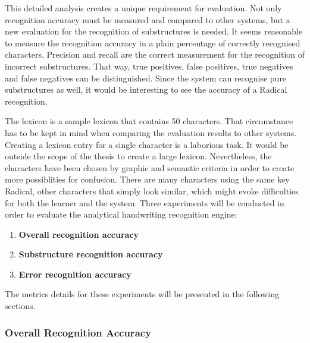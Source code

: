 This detailed analysis creates a unique requirement for evaluation. Not only
recognition accuracy must be measured and compared to other systems,
but a new evaluation for the recognition of substructures is needed.
It seems reasonable to measure the recognition accuracy in a plain 
percentage of correctly recognised characters. 
Precision and recall are the correct measurement for the recognition of 
incorrect substructures. That way, true positives, false positives, 
true negatives and false negatives can be distinguished.
Since the system can recognise pure substructures as well, it would 
be interesting to see the accuracy of a Radical recognition.

The lexicon is a sample lexicon that contains 50 characters. That circumstance
has to be kept in mind when comparing the evaluation results to other
systems. Creating a lexicon entry for a single character is a laborious task.
It would be outside the scope of the thesis to create a large lexicon.
Nevertheless, the characters have been chosen by graphic and
semantic criteria in order to create more possiblities for confusion.
There are many characters using the same key Radical, other characters
that simply look similar, which might evoke difficulties 
for both the learner and the system.
Three experiments will be conducted in order to evaluate the analytical
handwriting recognition engine:
\begin{enumerate}
  \item \textbf{Overall recognition accuracy} \label{eval:enum:overall}
  \item \textbf{Substructure recognition accuracy} \label{eval:enum:substructure}
  \item \textbf{Error recognition accuracy} \label{eval:enum:errorrecognition}
\end{enumerate}
The metrics details for these experiments will be presented in the following 
sections.

\subsubsection{Overall Recognition Accuracy}
\label{sec:eval:overallrecognitionaccuracy}

